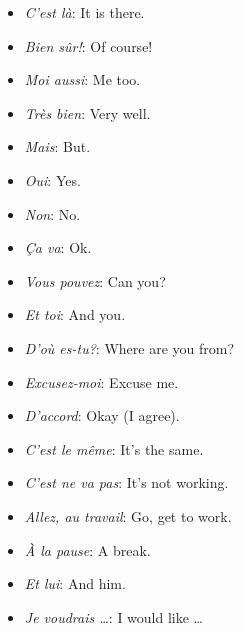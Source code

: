 \begin{itemize}
\item{\emph{C'est l\`a}: It is there.}

\item{\emph{Bien s\^ur!}: Of course!} 

\item{\emph{Moi aussi}: Me too.} 

\item{\emph{Tr\`es bien}: Very well.} 

\item{\emph{Mais}: But.}

\item{\emph{Oui}: Yes.} 

\item{\emph{Non}: No.}

\item{\emph{\c{C}a va}: Ok.} 

\item{\emph{Vous pouvez}: Can you?}

\item{\emph{Et toi}: And you.}

\item{\emph{D'o\`u es-tu?}: Where are you from?}

\item{\emph{Excusez-moi}: Excuse me.}

\item{\emph{D'accord}: Okay (I agree).}

\item{\emph{C'est le m\^eme}: It's the same.}

\item{\emph{C'est ne va pas}: It's not working.}

\item{\emph{Allez, au travail}: Go, get to work.}

\item{\emph{\`A la pause}: A break.}

\item{\emph{Et lui}: And him.}

\item{\emph{Je voudrais \dots}: I would like \dots}

\end{itemize}
